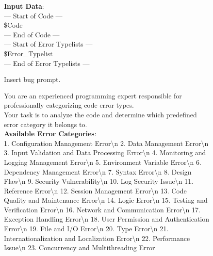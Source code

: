 \documentclass[11pt, a4paper, logo, copyright, nonumbering, amsart]{map}
\begin{document}
\begin{CJK*}{UTF8}{gbsn}
\begin{figure*}[h!]
\begin{center}
\begin{tcolorbox}[width=1\textwidth, colback=lightblue, title={\textbf{Insert Bug Prompt}}]
    \textbf{Input Data}:\\
    --- Start of Code ---\\
    \textcolor{ora}{\$Code}\\
    --- End of Code ---\\

    --- Start of Error Typelists ---\\
    \textcolor{ora}{\$Error\_Typelist}\\
    --- End of Error Typelists ---\\
    \end{tcolorbox}
\end{center}
\caption{Insert bug prompt.} \label{ap:prompt_insert_bug}
\end{figure*}

\begin{figure*}[h!]
\begin{center}
    \fontsize{8.4}{8.4} \selectfont
    \begin{tcolorbox}[width=1\textwidth, colback=lightblue, title={\textbf{Identifying Programming Error Types Prompt}}]

    You are an experienced programming expert responsible for professionally categorizing code error types.\\
    Your task is to analyze the code and determine which predefined error category it belongs to.\\
    
    \textbf{Available Error Categories}:\\
    1. Configuration Management Error\textcolor{ora}{\textbackslash n}
    2. Data Management Error\textcolor{ora}{\textbackslash n}
    3. Input Validation and Data Processing Error\textcolor{ora}{\textbackslash n}
    4. Monitoring and Logging Management Error\textcolor{ora}{\textbackslash n}
    5. Environment Variable Error\textcolor{ora}{\textbackslash n}
    6. Dependency Management Error\textcolor{ora}{\textbackslash n}
    7. Syntax Error\textcolor{ora}{\textbackslash n}
    8. Design Flaw\textcolor{ora}{\textbackslash n}
    9. Security Vulnerability\textcolor{ora}{\textbackslash n}
    10. Log Security Issue\textcolor{ora}{\textbackslash n}
    11. Reference Error\textcolor{ora}{\textbackslash n}
    12. Session Management Error\textcolor{ora}{\textbackslash n}
    13. Code Quality and Maintenance Error\textcolor{ora}{\textbackslash n}
    14. Logic Error\textcolor{ora}{\textbackslash n}
    15. Testing and Verification Error\textcolor{ora}{\textbackslash n}
    16. Network and Communication Error\textcolor{ora}{\textbackslash n}
    17. Exception Handling Error\textcolor{ora}{\textbackslash n}
    18. User Permission and Authentication Error\textcolor{ora}{\textbackslash n}
    19. File and I/O Error\textcolor{ora}{\textbackslash n}
    20. Type Error\textcolor{ora}{\textbackslash n}
    21. Internationalization and Localization Error\textcolor{ora}{\textbackslash n}
    22. Performance Issue\textcolor{ora}{\textbackslash n}
    23. Concurrency and Multithreading Error\\
    

\end{tcolorbox}
\end{center}
\end{figure*}
\end{CJK*}
\end{document}
